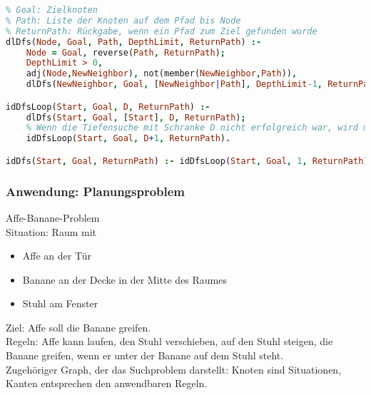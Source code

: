 \begin{lstlisting}[language=Prolog]
% Node: aktueller Knoten
% Goal: Zielknoten
% Path: Liste der Knoten auf dem Pfad bis Node
% ReturnPath: Rückgabe, wenn ein Pfad zum Ziel gefunden wurde
dlDfs(Node, Goal, Path, DepthLimit, ReturnPath) :-
	Node = Goal, reverse(Path, ReturnPath);
	DepthLimit > 0,
	adj(Node,NewNeighbor), not(member(NewNeighbor,Path)),
	dlDfs(NewNeighbor, Goal, [NewNeighbor|Path], DepthLimit-1, ReturnPath).

idDfsLoop(Start, Goal, D, ReturnPath) :-
	dlDfs(Start, Goal, [Start], D, ReturnPath);
	% Wenn die Tiefensuche mit Schranke D nicht erfolgreich war, wird mit Schranke D+1 weitergesucht.
	idDfsLoop(Start, Goal, D+1, ReturnPath).

idDfs(Start, Goal, ReturnPath) :- idDfsLoop(Start, Goal, 1, ReturnPath).

\end{lstlisting}

\subsubsection{Anwendung: Planungsproblem}
Affe-Banane-Problem\\
Situation: Raum mit
\begin{itemize}
\item Affe an der Tür
\item Banane an der Decke in der Mitte des Raumes
\item Stuhl am Fenster
\end{itemize}
Ziel: Affe soll die Banane greifen.\\
Regeln: Affe kann laufen, den Stuhl verschieben, auf den Stuhl steigen, die Banane greifen, wenn er unter der Banane auf dem Stuhl steht.\\
Zugehöriger Graph, der das Suchproblem darstellt: Knoten sind Situationen, Kanten entsprechen den anwendbaren Regeln.
\begin{center}
\end{center}

